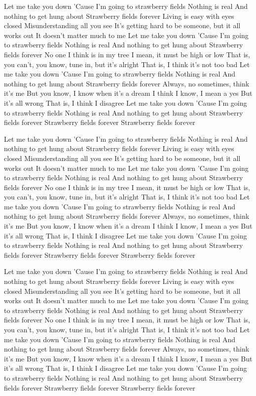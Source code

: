 \documentclass[12pt]{article}
\begin{document}
Let me take you down
'Cause I'm going to strawberry fields
Nothing is real
And nothing to get hung about
Strawberry fields forever
Living is easy with eyes closed
Misunderstanding all you see
It's getting hard to be someone, but it all works out
It doesn't matter much to me
Let me take you down
'Cause I'm going to strawberry fields
Nothing is real
And nothing to get hung about
Strawberry fields forever
No one I think is in my tree
I mean, it must be high or low
That is, you can't, you know, tune in, but it's alright
That is, I think it's not too bad
Let me take you down
'Cause I'm going to strawberry fields
Nothing is real
And nothing to get hung about
Strawberry fields forever
Always, no sometimes, think it's me
But you know, I know when it's a dream
I think I know, I mean a yes
But it's all wrong
That is, I think I disagree
Let me take you down
'Cause I'm going to strawberry fields
Nothing is real
And nothing to get hung about
Strawberry fields forever
Strawberry fields forever
Strawberry fields forever 


Let me take you down
'Cause I'm going to strawberry fields
Nothing is real
And nothing to get hung about
Strawberry fields forever
Living is easy with eyes closed
Misunderstanding all you see
It's getting hard to be someone, but it all works out
It doesn't matter much to me
Let me take you down
'Cause I'm going to strawberry fields
Nothing is real
And nothing to get hung about
Strawberry fields forever
No one I think is in my tree
I mean, it must be high or low
That is, you can't, you know, tune in, but it's alright
That is, I think it's not too bad
Let me take you down
'Cause I'm going to strawberry fields
Nothing is real
And nothing to get hung about
Strawberry fields forever
Always, no sometimes, think it's me
But you know, I know when it's a dream
I think I know, I mean a yes
But it's all wrong
That is, I think I disagree
Let me take you down
'Cause I'm going to strawberry fields
Nothing is real
And nothing to get hung about
Strawberry fields forever
Strawberry fields forever
Strawberry fields forever


Let me take you down
'Cause I'm going to strawberry fields
Nothing is real
And nothing to get hung about
Strawberry fields forever
Living is easy with eyes closed
Misunderstanding all you see
It's getting hard to be someone, but it all works out
It doesn't matter much to me
Let me take you down
'Cause I'm going to strawberry fields
Nothing is real
And nothing to get hung about
Strawberry fields forever
No one I think is in my tree
I mean, it must be high or low
That is, you can't, you know, tune in, but it's alright
That is, I think it's not too bad
Let me take you down
'Cause I'm going to strawberry fields
Nothing is real
And nothing to get hung about
Strawberry fields forever
Always, no sometimes, think it's me
But you know, I know when it's a dream
I think I know, I mean a yes
But it's all wrong
That is, I think I disagree
Let me take you down
'Cause I'm going to strawberry fields
Nothing is real
And nothing to get hung about
Strawberry fields forever
Strawberry fields forever
Strawberry fields forever
\end{document}
